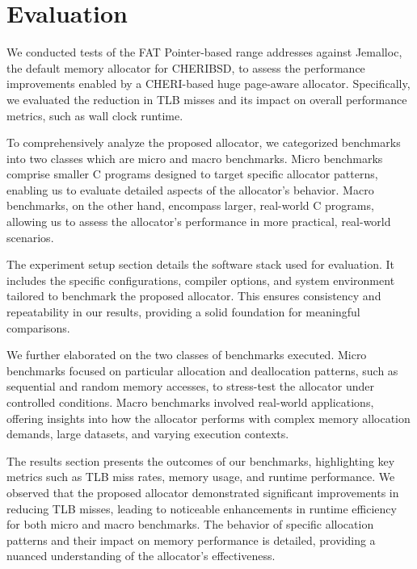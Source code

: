 \documentclass[11pt]{article}
\author{Akilan}
\date{\today}
\title{}
\begin{document}
\tableofcontents

\section{Evaluation}
\label{sec:orgdc1fb32}

We conducted tests of the FAT Pointer-based range addresses against Jemalloc\cite{jemalloc}, 
the default memory allocator for CHERIBSD\cite{cheribsd}, to assess the performance improvements 
enabled by a CHERI-based huge page-aware allocator. Specifically, we evaluated 
the reduction in TLB misses and its impact on overall 
performance metrics, such as wall clock runtime.

To comprehensively analyze the proposed allocator, we categorized benchmarks into 
two classes which are micro and macro benchmarks. Micro benchmarks comprise smaller 
C programs designed to target specific allocator patterns, enabling us to evaluate 
detailed aspects of the allocator's behavior. Macro benchmarks, on the other hand, 
encompass larger, real-world C programs, allowing us to assess the allocator's 
performance in more practical, real-world scenarios.

The experiment setup section details the software stack used for evaluation. It includes 
the specific configurations, compiler options, and system environment tailored 
to benchmark the proposed allocator. This ensures consistency and repeatability 
in our results, providing a solid foundation for meaningful comparisons.

We further elaborated on the two classes of benchmarks executed. Micro benchmarks 
focused on particular allocation and deallocation patterns, such as sequential and 
random memory accesses, to stress-test the allocator under controlled conditions. 
Macro benchmarks involved real-world applications, offering insights into how 
the allocator performs with complex memory allocation demands, large datasets, 
and varying execution contexts.

The results section presents the outcomes of our benchmarks, highlighting key metrics 
such as TLB miss rates, memory usage, and runtime performance. We observed that the 
proposed allocator demonstrated significant improvements in reducing TLB misses, 
leading to noticeable enhancements in runtime efficiency for both micro and macro 
benchmarks. The behavior of specific allocation patterns and their impact on memory 
performance is detailed, providing a nuanced understanding of the allocator's effectiveness.
\end{document}
